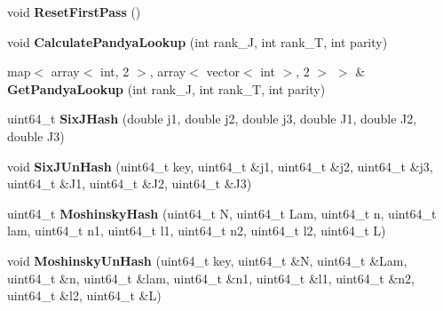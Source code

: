 \begin{DoxyCompactItemize}
\item 
void {\bfseries Reset\+First\+Pass} ()\hypertarget{classModelSpace_a3354ef5c4dbcae5786759696ab500951}{}\label{classModelSpace_a3354ef5c4dbcae5786759696ab500951}

\item 
void {\bfseries Calculate\+Pandya\+Lookup} (int rank\+\_\+J, int rank\+\_\+T, int parity)\hypertarget{classModelSpace_abe6a15d78c5a16e707a02e5d2341f1f0}{}\label{classModelSpace_abe6a15d78c5a16e707a02e5d2341f1f0}

\item 
map$<$ array$<$ int, 2 $>$, array$<$ vector$<$ int $>$, 2 $>$ $>$ \& {\bfseries Get\+Pandya\+Lookup} (int rank\+\_\+J, int rank\+\_\+T, int parity)\hypertarget{classModelSpace_a2e75ef41cd7f02485a5ab5c340c27bef}{}\label{classModelSpace_a2e75ef41cd7f02485a5ab5c340c27bef}

\item 
uint64\+\_\+t {\bfseries Six\+J\+Hash} (double j1, double j2, double j3, double J1, double J2, double J3)\hypertarget{classModelSpace_a6727d45bfcee5a6aa9181da6802fc948}{}\label{classModelSpace_a6727d45bfcee5a6aa9181da6802fc948}

\item 
void {\bfseries Six\+J\+Un\+Hash} (uint64\+\_\+t key, uint64\+\_\+t \&j1, uint64\+\_\+t \&j2, uint64\+\_\+t \&j3, uint64\+\_\+t \&J1, uint64\+\_\+t \&J2, uint64\+\_\+t \&J3)\hypertarget{classModelSpace_a074b15f27c3c302e5594ce1bc03d774a}{}\label{classModelSpace_a074b15f27c3c302e5594ce1bc03d774a}

\item 
uint64\+\_\+t {\bfseries Moshinsky\+Hash} (uint64\+\_\+t N, uint64\+\_\+t Lam, uint64\+\_\+t n, uint64\+\_\+t lam, uint64\+\_\+t n1, uint64\+\_\+t l1, uint64\+\_\+t n2, uint64\+\_\+t l2, uint64\+\_\+t L)\hypertarget{classModelSpace_a5503bab63a0392cf5914fb897f623003}{}\label{classModelSpace_a5503bab63a0392cf5914fb897f623003}

\item 
void {\bfseries Moshinsky\+Un\+Hash} (uint64\+\_\+t key, uint64\+\_\+t \&N, uint64\+\_\+t \&Lam, uint64\+\_\+t \&n, uint64\+\_\+t \&lam, uint64\+\_\+t \&n1, uint64\+\_\+t \&l1, uint64\+\_\+t \&n2, uint64\+\_\+t \&l2, uint64\+\_\+t \&L)\hypertarget{classModelSpace_a3b58b32f835092158b45b82101e4ad5a}{}\label{classModelSpace_a3b58b32f835092158b45b82101e4ad5a}

\end{DoxyCompactItemize}
